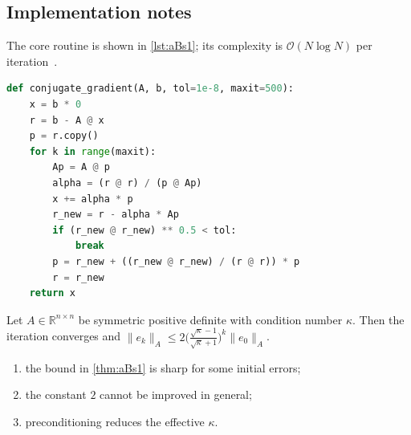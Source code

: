 \kant[4-11]

\subsection{Implementation notes}\label{sec:aBs1-i}
The core routine is shown in \cref{lst:aBs1}; its complexity is $\mathcal{O}(N\log N)$ per iteration~\cite{appx-9}.

\begin{lstlisting}[language=python,caption={Reference implementation for aBs1.},label={lst:aBs1}]
def conjugate_gradient(A, b, tol=1e-8, maxit=500):
    x = b * 0
    r = b - A @ x
    p = r.copy()
    for k in range(maxit):
        Ap = A @ p
        alpha = (r @ r) / (p @ Ap)
        x += alpha * p
        r_new = r - alpha * Ap
        if (r_new @ r_new) ** 0.5 < tol:
            break
        p = r_new + ((r_new @ r_new) / (r @ r)) * p
        r = r_new
    return x
\end{lstlisting}

\lipsum[18-18]
\begin{theorem}\label{thm:aBs1}
Let $A\in\mathbb{R}^{n\times n}$ be symmetric positive definite with condition number $\kappa$. Then the iteration converges and
$\lVert e_k\rVert_A \le 2\bigl(\tfrac{\sqrt\kappa-1}{\sqrt\kappa+1}\bigr)^k\lVert e_0\rVert_A$.
\end{theorem}
\begin{enumerate}[label=(\roman*)]
\item the bound in \cref{thm:aBs1} is sharp for some initial errors;
\item the constant $2$ cannot be improved in general;
\item preconditioning reduces the effective $\kappa$.
\end{enumerate}

